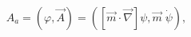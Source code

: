 \begin{equation}
A_a = (\varphi,\vec A) = 
\left( [\vec m\cdot\vec\nabla] \psi, \vec m\; \dot\psi\right),
\end{equation}

